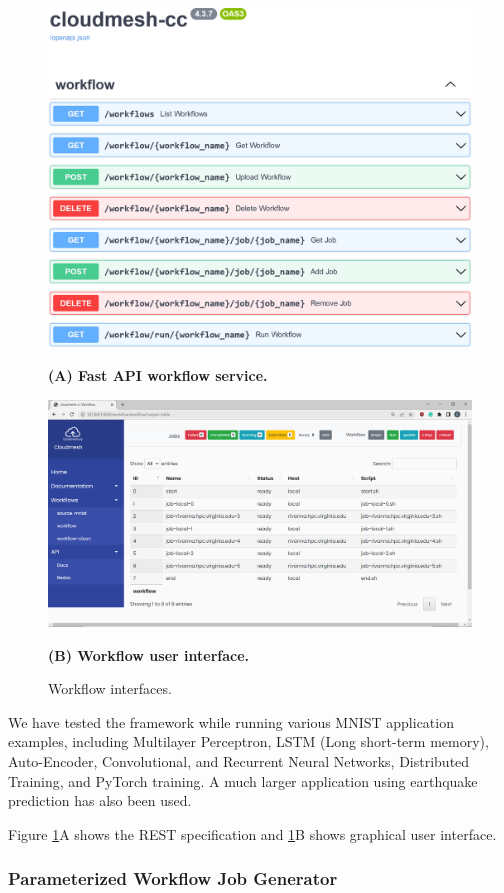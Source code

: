 \documentclass[utf8]{FrontiersinVancouver} %
\begin{document}
\begin{figure}[htb]
  \centering\includegraphics[width=0.8\columnwidth]{images/fastapi-service-highres.jpg}
  
  {\bf (A) Fast API workflow service.}

  \bigskip


    \centering\includegraphics[width=0.8\columnwidth]{images/cc-1.jpg}

    {\bf (B) Workflow user interface.}

    \caption{Workflow interfaces.}
    \label{fig:cc-3}
\end{figure}


We have tested the framework while running various MNIST application
examples, including Multilayer Perceptron, LSTM (Long short-term
memory), Auto-Encoder, Convolutional, and Recurrent Neural Networks,
Distributed Training, and PyTorch training.  A much larger application
using earthquake prediction has also been used.

Figure \ref{fig:cc-3}A shows the REST specification and
\ref{fig:cc-3}B shows graphical user interface.

\subsubsection{Parameterized Workflow Job Generator}
\label{sec:workflow-sbatch}
\end{document}
